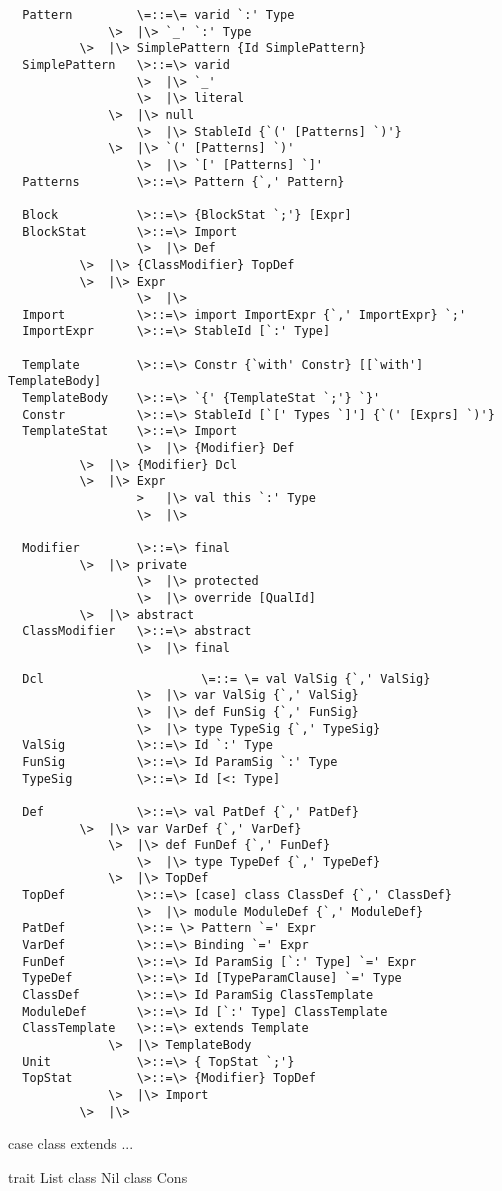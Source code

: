 \documentclass[11pt]{report}
\begin{document}
\begin{verbatim}
  Pattern         \=::=\= varid `:' Type
	          \>  |\> `_' `:' Type
		  \>  |\> SimplePattern {Id SimplePattern}
  SimplePattern   \>::=\> varid
                  \>  |\> `_'
                  \>  |\> literal
	          \>  |\> null
                  \>  |\> StableId {`(' [Patterns] `)'}
	          \>  |\> `(' [Patterns] `)'
                  \>  |\> `[' [Patterns] `]'
  Patterns        \>::=\> Pattern {`,' Pattern}

  Block           \>::=\> {BlockStat `;'} [Expr]
  BlockStat       \>::=\> Import
                  \>  |\> Def
		  \>  |\> {ClassModifier} TopDef
		  \>  |\> Expr
                  \>  |\>
  Import          \>::=\> import ImportExpr {`,' ImportExpr} `;'
  ImportExpr      \>::=\> StableId [`:' Type]

  Template        \>::=\> Constr {`with' Constr} [[`with'] TemplateBody]
  TemplateBody    \>::=\> `{' {TemplateStat `;'} `}'
  Constr          \>::=\> StableId [`[' Types `]'] {`(' [Exprs] `)'}
  TemplateStat    \>::=\> Import
                  \>  |\> {Modifier} Def
		  \>  |\> {Modifier} Dcl
		  \>  |\> Expr
                  >   |\> val this `:' Type
                  \>  |\>

  Modifier        \>::=\> final
		  \>  |\> private
                  \>  |\> protected
                  \>  |\> override [QualId]
		  \>  |\> abstract
  ClassModifier   \>::=\> abstract
                  \>  |\> final
\end{verbatim}
\begin{verbatim}
  Dcl                      \=::= \= val ValSig {`,' ValSig}
                  \>  |\> var ValSig {`,' ValSig}
                  \>  |\> def FunSig {`,' FunSig}
                  \>  |\> type TypeSig {`,' TypeSig}
  ValSig          \>::=\> Id `:' Type
  FunSig          \>::=\> Id ParamSig `:' Type
  TypeSig         \>::=\> Id [<: Type]

  Def             \>::=\> val PatDef {`,' PatDef}
		  \>  |\> var VarDef {`,' VarDef}
  	          \>  |\> def FunDef {`,' FunDef}
                  \>  |\> type TypeDef {`,' TypeDef}
	          \>  |\> TopDef
  TopDef          \>::=\> [case] class ClassDef {`,' ClassDef}
                  \>  |\> module ModuleDef {`,' ModuleDef}
  PatDef          \>::= \> Pattern `=' Expr
  VarDef          \>::=\> Binding `=' Expr
  FunDef          \>::=\> Id ParamSig [`:' Type] `=' Expr
  TypeDef         \>::=\> Id [TypeParamClause] `=' Type
  ClassDef        \>::=\> Id ParamSig ClassTemplate
  ModuleDef       \>::=\> Id [`:' Type] ClassTemplate
  ClassTemplate   \>::=\> extends Template
	          \>  |\> TemplateBody
  Unit            \>::=\> { TopStat `;'}
  TopStat         \>::=\> {Modifier} TopDef
	          \>  |\> Import
		  \>  |\>
\end{verbatim}

case class extends { ... }

trait List { }
class Nil
class Cons

\end{document}
